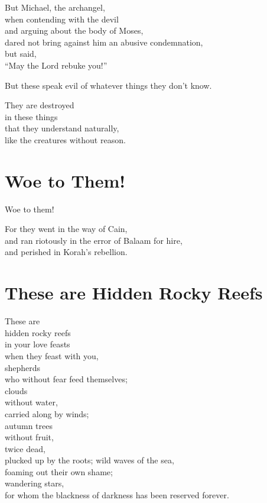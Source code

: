 But Michael,
the archangel,
\\
when contending with the devil
\\
and arguing about the body of Moses,
\\
\tab{}
dared not bring against him an abusive condemnation,
\\
but said,
\\
\tab{}
``May the Lord rebuke you!''

But these speak evil of whatever things they don’t know.

They are destroyed
\\
\tab{}
in these things
\\
\tab{}
\tab{}
that they understand naturally,
\\
like the creatures without reason.

\newpage\section{Woe to Them!}

Woe to them!

For they went in the way of Cain,
\\
and ran riotously in the error of Balaam for hire,
\\
and perished in Korah's rebellion.

\newpage\section{These are Hidden Rocky Reefs}

These are
\\
\tab{}
hidden rocky reefs
\\
\tab{}
\tab{}
in your love feasts
\\
\tab{}
\tab{}
\tab{}
when they feast with you,
\\
\tab{}
shepherds
\\
\tab{}
\tab{}
who without fear feed themselves;
\\
\tab{}
clouds
\\
\tab{}
\tab{}
without water,
\\
\tab{}
\tab{}
carried along by winds;
\\
\tab{}
autumn trees
\\
\tab{}
\tab{}
without fruit,
\\
\tab{}
\tab{}
twice dead,
\\
\tab{}
\tab{}
\tab{}
plucked up by the roots;
wild waves of the sea,
\\
\tab{}
\tab{}
foaming out their own shame;
\\
\tab{}
wandering stars,
\\
\tab{}
\tab{}
for whom the blackness of darkness
has been reserved forever.

